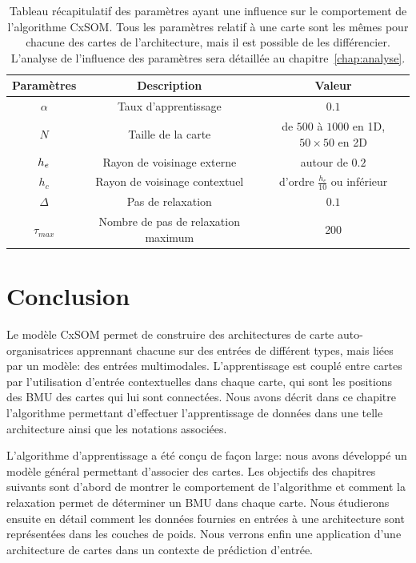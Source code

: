 \documentclass[../main]{subfiles}
\begin{document}
\begin{table}
\caption{Tableau récapitulatif des paramètres ayant une influence sur le comportement de l'algorithme CxSOM. Tous les paramètres relatif à une carte sont les mêmes pour chacune des cartes de l'architecture, mais il est possible de les différencier. L'analyse de l'influence des paramètres sera détaillée au chapitre~\ref{chap:analyse}.}\label{tab:params}
\vspace{3mm}
\begin{tabular}{|c|c|c|}
\hline
Paramètres & Description & Valeur \\
\hline
$\alpha$ & Taux d'apprentissage & $0.1$ \\
$N$ & Taille de la carte & de $500$ à $1000$ en 1D, $50 \times 50$ en 2D \\
$h_e$ & Rayon de voisinage externe & autour de $0.2$ \\
$h_c$ & Rayon de voisinage contextuel & d'ordre $\frac{h_e}{10}$ ou inférieur \\
$\Delta$ & Pas de relaxation & $0.1$ \\
$\tau_{max}$ & Nombre de pas de relaxation maximum & 200 \\
\hline
\end{tabular}
\end{table}


\section{Conclusion}

Le modèle CxSOM permet de construire des architectures de carte auto-organisatrices apprennant chacune sur des entrées de différent types, mais liées par un modèle: des entrées multimodales. L'apprentissage est couplé entre cartes par l'utilisation d'entrée contextuelles dans chaque carte, qui sont les positions des BMU des cartes qui lui sont connectées. Nous avons décrit dans ce chapitre l'algorithme permettant d'effectuer l'apprentissage de données dans une telle architecture ainsi que les notations associées.

L'algorithme d'apprentissage a été conçu de façon large: nous avons développé un modèle général permettant d'associer des cartes. Les objectifs des chapitres suivants sont d'abord de montrer le comportement de l'algorithme et comment la relaxation permet de déterminer un BMU dans chaque carte. Nous étudierons ensuite en détail comment les données fournies en entrées à une architecture sont représentées dans les couches de poids. Nous verrons enfin une application d'une architecture de cartes dans un contexte de prédiction d'entrée.
\end{document}
